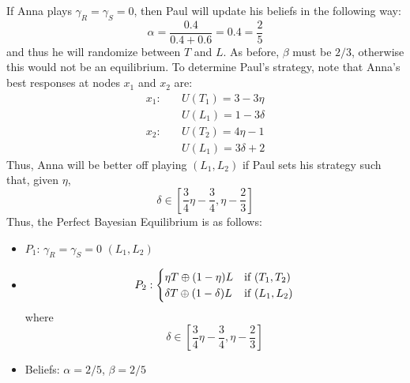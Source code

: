 \documentclass[11pt]{article}
\begin{document}
\begin{enumerate}
	If Anna plays $ \gamma_R  = \gamma_S = 0 $, then Paul will update his beliefs in the following way:
	\[\alpha = \frac{0.4}{0.4 + 0.6} = 0.4 = \frac{2}{5}\]
	and thus he will randomize between $ T $ and $ L $. As before, $\beta$ must be $ 2/3 $, otherwise this would not be an equilibrium. To determine Paul's strategy, note that Anna's best responses at nodes $ x_1 $ and $ x_2 $ are:
	\begin{align*}
	x_1: \quad & U(T_1) = 3 - 3\eta \\
	&U(L_1) = 1 - 3\delta \\
	x_2:\quad & U(T_2) = 4\eta - 1 \\
	& U(L_1) = 3\delta + 2
	\end{align*}
	Thus, Anna will be better off playing $ (L_1, L_2) $ if Paul sets his strategy such that, given $\eta$, 
	\[\delta\in\left[\frac{3}{4}\eta - \frac{3}{4}, \eta - \frac{2}{3}\right]\]
	Thus, the Perfect Bayesian Equilibrium is as follows: 
	\begin{itemize}
		\item $ P_1 $: $ \gamma_R = \gamma_S = 0 $ $ (L_1, L_2) $
		\item \[P_2: \begin{cases}
		\eta T \oplus (1 - \eta)L & \text{if $ (T_1, T_2) $} \\
		\delta T \oplus (1 - \delta) L & \text{if $ (L_1, L_2) $}
		\end{cases}\]
		where 
		\[\delta\in\left[\frac{3}{4}\eta - \frac{3}{4}, \eta - \frac{2}{3}\right]\]
		\item Beliefs: $\alpha = 2/5$, $ \beta = 2/5 $ 
	\end{itemize}


\end{enumerate}
\end{document}
